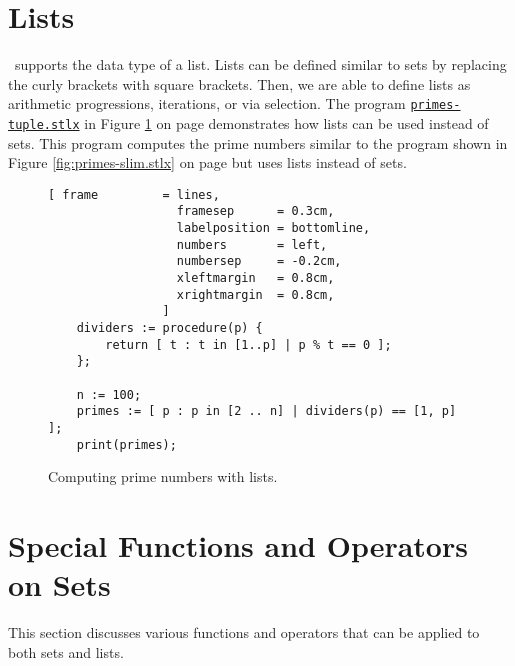 \section{Lists}
\setlx\ supports the data type of a list.  Lists can be defined similar to sets by replacing the curly brackets
with square brackets.  Then, we are able to define lists as arithmetic progressions, iterations, or via selection.
The program 
\href{https://github.com/karlstroetmann/Logik/blob/master/SetlX/primes-tuple.stlx}{\texttt{primes-tuple.stlx}}
in Figure \ref{fig:primes-tuple.stlx} on page \pageref{fig:primes-tuple.stlx} demonstrates how lists can be
used instead of sets.  This program computes the prime numbers similar to the program shown in Figure
\ref{fig:primes-slim.stlx} on page \pageref{fig:primes-slim.stlx} but uses lists instead of sets.


\begin{figure}[!ht]
  \centering
\begin{Verbatim}[ frame         = lines, 
                  framesep      = 0.3cm, 
                  labelposition = bottomline,
                  numbers       = left,
                  numbersep     = -0.2cm,
                  xleftmargin   = 0.8cm,
                  xrightmargin  = 0.8cm,
                ]
    dividers := procedure(p) {
        return [ t : t in [1..p] | p % t == 0 ];
    };
    
    n := 100;
    primes := [ p : p in [2 .. n] | dividers(p) == [1, p] ];
    print(primes);
\end{Verbatim} 
\vspace*{-0.3cm}
\caption{Computing prime numbers with lists.}  
\label{fig:primes-tuple.stlx}
\end{figure} 

\section{Special Functions and Operators on Sets}
This section discusses various functions and operators that can be applied to both sets and lists.

